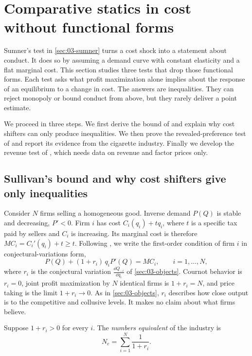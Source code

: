 \section{Comparative statics in cost without functional forms}\label{sec:03-revenue-tests}

Sumner's test in \cref{sec:03-sumner} turns a cost shock into a statement about conduct. It does so by
assuming a demand curve with constant elasticity and a flat marginal cost. This section studies three tests
that drop those functional forms. Each test asks what profit maximization alone implies about the response
of an equilibrium to a change in cost. The answers are inequalities. They can reject monopoly or bound
conduct from above, but they rarely deliver a point estimate.

We proceed in three steps. We first derive the bound of \citet{Sullivan1985} and explain why cost shifters
can only produce inequalities. We then prove the revealed-preference test of \citet{AshenfelterSullivan1987}
and report its evidence from the cigarette industry. Finally we develop the revenue test of
\citet{PanzarRosse1987}, which needs data on revenue and factor prices only.

\subsection{Sullivan's bound and why cost shifters give only inequalities}\label{sec:03-sullivan}

Consider $N$ firms selling a homogeneous good. Inverse demand $P(Q)$ is stable and decreasing, $P' < 0$.
Firm $i$ has cost $C_i(q_i) + t q_i$, where $t$ is a specific tax paid by sellers and $C_i$ is increasing.
Its marginal cost is therefore $MC_i = C_i'(q_i) + t \ge t$. Following \citet[eq.~24]{Bresnahan1989}, we
write the first-order condition of firm $i$ in conjectural-variations form,
\begin{equation}\label{eq:03-cv-foc}
  P(Q) + (1 + r_i)\, q_i P'(Q) = MC_i, \qquad i = 1, \dots, N,
\end{equation}
where $r_i$ is the conjectural variation $\frac{\dd Q_{-i}}{\dd q_i}$ of \cref{sec:03-objects}. Cournot behavior is
$r_i = 0$, joint profit maximization by $N$ identical firms is $1 + r_i = N$, and price taking is the limit
$1 + r_i \to 0$. As in \cref{sec:03-objects}, $r_i$ describes how close output is to the competitive and
collusive levels. It makes no claim about what firms believe.

\begin{definition}\label{def:03-numbers-equivalent}
Suppose $1 + r_i > 0$ for every $i$. The \emph{numbers equivalent} of the industry is
\begin{equation*}
  N_e = \sum_{i=1}^{N} \frac{1}{1 + r_i}.
\end{equation*}
\end{definition}

